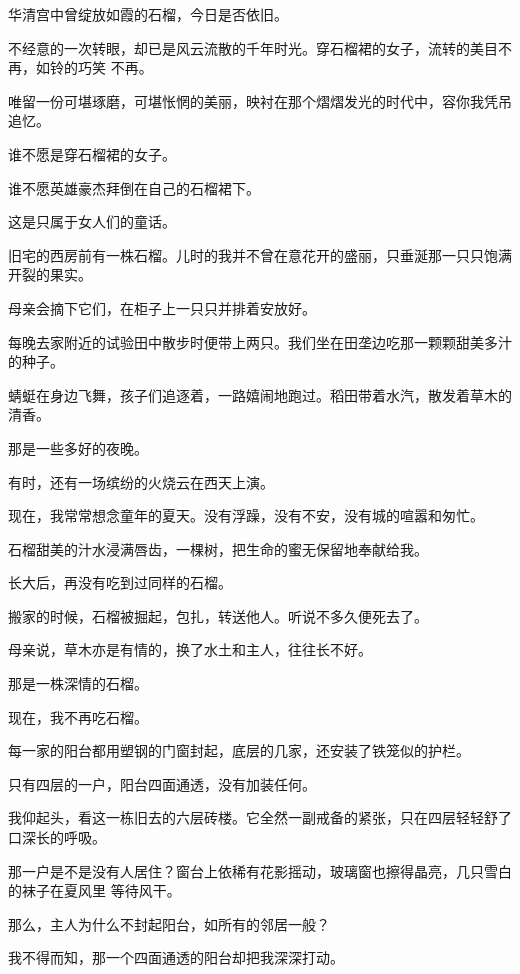		华清宫中曾绽放如霞的石榴，今日是否依旧。

		不经意的一次转眼，却已是风云流散的千年时光。穿石榴裙的女子，流转的美目不再，如铃的巧笑
	不再。

		唯留一份可堪琢磨，可堪怅惘的美丽，映衬在那个熠熠发光的时代中，容你我凭吊追忆。\par
		谁不愿是穿石榴裙的女子。\par
		谁不愿英雄豪杰拜倒在自己的石榴裙下。\par
		这是只属于女人们的童话。

		\vspace{1em}
		旧宅的西房前有一株石榴。儿时的我并不曾在意花开的盛丽，只垂涎那一只只饱满开裂的果实。\par
		母亲会摘下它们，在柜子上一只只并排着安放好。\par
		每晚去家附近的试验田中散步时便带上两只。我们坐在田垄边吃那一颗颗甜美多汁的种子。\par
		蜻蜓在身边飞舞，孩子们追逐着，一路嬉闹地跑过。稻田带着水汽，散发着草木的清香。\par
		那是一些多好的夜晚。\par
		有时，还有一场缤纷的火烧云在西天上演。\par
		现在，我常常想念童年的夏天。没有浮躁，没有不安，没有城的喧嚣和匆忙。\par
		石榴甜美的汁水浸满唇齿，一棵树，把生命的蜜无保留地奉献给我。\par
		长大后，再没有吃到过同样的石榴。\par
		搬家的时候，石榴被掘起，包扎，转送他人。听说不多久便死去了。\par
		母亲说，草木亦是有情的，换了水土和主人，往往长不好。\par
		那是一株深情的石榴。\par
		现在，我不再吃石榴。



		每一家的阳台都用塑钢的门窗封起，底层的几家，还安装了铁笼似的护栏。\par
		只有四层的一户，阳台四面通透，没有加装任何。\par
		我仰起头，看这一栋旧去的六层砖楼。它全然一副戒备的紧张，只在四层轻轻舒了口深长的呼吸。

		那一户是不是没有人居住？窗台上依稀有花影摇动，玻璃窗也擦得晶亮，几只雪白的袜子在夏风里
	等待风干。

		那么，主人为什么不封起阳台，如所有的邻居一般？\par
		我不得而知，那一个四面通透的阳台却把我深深打动。

